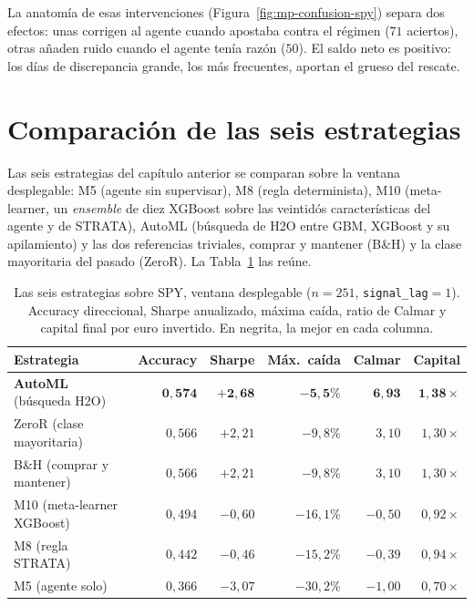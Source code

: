 La anatomía de esas intervenciones (Figura~\ref{fig:mp-confusion-spy}) separa dos efectos: unas corrigen al agente cuando apostaba contra el régimen ($71$ aciertos), otras añaden ruido cuando el agente tenía razón ($50$). El saldo neto es positivo: los días de discrepancia grande, los más frecuentes, aportan el grueso del rescate.

\section{Comparación de las seis estrategias}
\label{sec:spy-estrategias}

Las seis estrategias del capítulo anterior se comparan sobre la ventana desplegable: M5 (agente sin supervisar), M8 (regla determinista), M10 (meta-learner, un \emph{ensemble} de diez XGBoost sobre las veintidós características del agente y de STRATA), AutoML (búsqueda de H2O entre GBM, XGBoost y su apilamiento) y las dos referencias triviales, comprar y mantener (B\&H) y la clase mayoritaria del pasado (ZeroR). La Tabla~\ref{tab:mp-spy} las reúne.

\begin{table}[htbp]
\centering
\caption{Las seis estrategias sobre SPY, ventana desplegable ($n = 251$, \texttt{signal\_lag}${}=1$). Accuracy direccional, Sharpe anualizado, máxima caída, ratio de Calmar \cite{young1991} y capital final por euro invertido. En negrita, la mejor en cada columna.}
\label{tab:mp-spy}
\begin{tabular}{lrrrrr}
\toprule
Estrategia & Accuracy & Sharpe & Máx.\ caída & Calmar & Capital \\
\midrule
\textbf{AutoML} (búsqueda H2O) & $\mathbf{0{,}574}$ & $\mathbf{+2{,}68}$ & $\mathbf{-5{,}5\%}$ & $\mathbf{6{,}93}$ & $\mathbf{1{,}38\times}$ \\
ZeroR (clase mayoritaria) & $0{,}566$ & $+2{,}21$ & $-9{,}8\%$ & $3{,}10$ & $1{,}30\times$ \\
B\&H (comprar y mantener) & $0{,}566$ & $+2{,}21$ & $-9{,}8\%$ & $3{,}10$ & $1{,}30\times$ \\
M10 (meta-learner XGBoost) & $0{,}494$ & $-0{,}60$ & $-16{,}1\%$ & $-0{,}50$ & $0{,}92\times$ \\
M8 (regla STRATA) & $0{,}442$ & $-0{,}46$ & $-15{,}2\%$ & $-0{,}39$ & $0{,}94\times$ \\
M5 (agente solo) & $0{,}366$ & $-3{,}07$ & $-30{,}2\%$ & $-1{,}00$ & $0{,}70\times$ \\
\bottomrule
\end{tabular}
\end{table}


